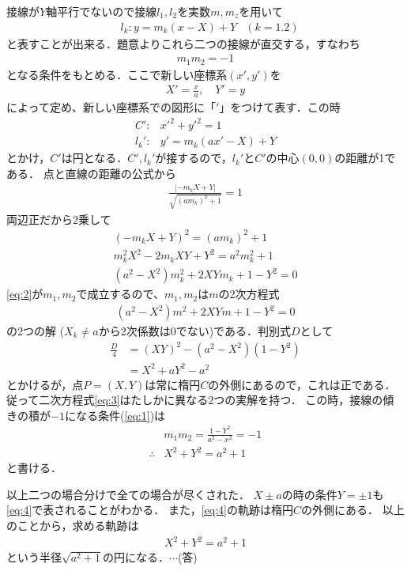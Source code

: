 \documentclass[a4paper,10pt]{ltjsarticle}
\begin{document}
\begin{multicols}{2}
接線が$Y$軸平行でないので接線$l_1, l_2$を実数$m, m_z$を用いて
\begin{align*}
  &l_k: y = m_k(x-X)+Y & (k=1.2)
\end{align*}
と表すことが出来る．題意よりこれら二つの接線が直交する，すなわち
\begin{align}
  m_1m_2=-1 \label{eq:1}
\end{align}
となる条件をもとめる．ここで新しい座標系$(x', y')$を
\begin{align*}
  X'=\frac{x}{a}, \quad Y'=y
\end{align*}
によって定め、新しい座標系での図形に「$'$」をつけて表す．この時
\begin{align*}
  C':   & x'^2+y'^2=1 \\
  l_k': & y'=m_k(ax'-X)+Y
\end{align*}
とかけ，$C'$は円となる．$C', l_k'$が接するので，$l_k'$と$C'$の中心$(0,0)$の距離が1である．
点と直線の距離の公式から
\begin{align*}
  \frac{|-m_k X+Y|}{\sqrt{(am_k)^2+1}}=1  
\end{align*}
両辺正だから2乗して
\begin{align}
  (-m_k X+Y)^2 = (am_k)^2+1 \nonumber \\
  m_k^2 X^2 - 2m_k XY + Y^2 = a^2 m_k^2 + 1 \nonumber \\ 
  (a^2-X^2)m_k^2 + 2XY m_k + 1- Y^2 = 0 \label{eq:2}
\end{align}
\cref{eq:2}が$m_1, m_2$で成立するので、$m_1, m_2$は$m$の2次方程式
\begin{align}
  (a^2-X^2)m^2+2XY m + 1-Y^2 = 0   \label{eq:3}
\end{align}
の2つの解 ($X_k \neq a$から2次係数は$0$でない)である．判別式$D$として
\begin{align*}
  \frac{D}{4}
  &=(XY)^2-(a^2-X^2)(1-Y^2) \\
  &=X^2 + aY^2-a^2
\end{align*}
とかけるが，点$P=(X,Y)$は常に楕円$C$の外側にあるので，これは正である．
従って二次方程式\cref{eq:3}はたしかに異なる2つの実解を持つ．
この時，接線の傾きの積が$-1$になる条件(\cref{eq:1})は
\begin{align}
  &m_1m_2 = \frac{1-Y^2}{a^2-x^2}=-1 \nonumber \\
  \therefore 
  & X^2+Y^2=a^2+1  \label{eq:4}
\end{align}
と書ける．

以上二つの場合分けで全ての場合が尽くされた．
$X\pm a$の時の条件$Y=\pm 1$も\cref{eq:4}で表されることがわかる．
また，\cref{eq:4}の軌跡は楕円$C$の外側にある．
以上のことから，求める軌跡は
\begin{align*}
  X^2+Y^2=a^2+1  
\end{align*}
という半径$\sqrt{a^2+1}$の円になる．$\cdots$(答)


\end{multicols}
\end{document}
